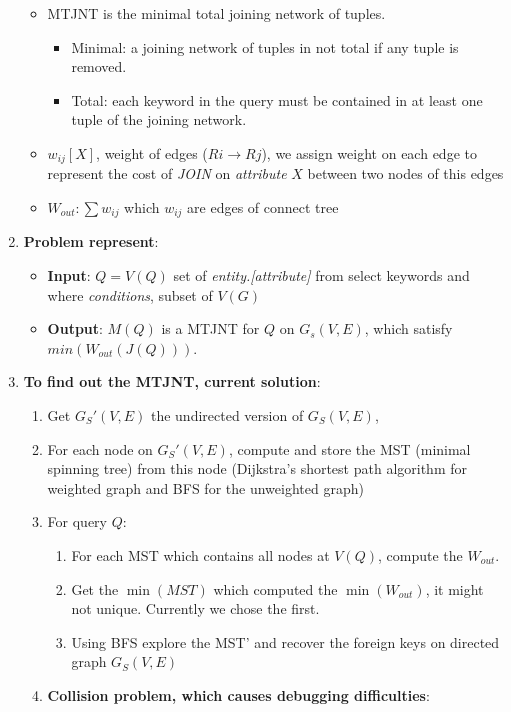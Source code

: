 \begin{enumerate}
\begin{itemize}
  \item MTJNT is the minimal total joining network of tuples.
    \begin{itemize}
    \item Minimal: a joining network of tuples in not total if any tuple is removed.
    \item Total: each keyword in the query must be contained in at least one tuple of the joining network.
    \end{itemize}
  \item $w_{ij}[X]$, weight of edges ($Ri \rightarrow Rj$), we assign weight on each edge to represent the cost of {\it JOIN} on {\it attribute} $X$ between two nodes of this edges
  \item $W_{out}: \sum{w_{ij}}$ which $w_{ij}$ are edges of connect tree 
  \end{itemize}
\item {\bf Problem represent}:
\begin{itemize}
  \item {\bf Input}: $Q = V(Q)$  set of {\it entity.[attribute]} from select keywords and where {\it conditions}, subset of $V(G)$ 
  \item {\bf Output}: $M(Q)$ is a MTJNT for $Q$ on $G_s(V,E)$, which satisfy \\
        $min(W_{out}(J(Q)))$.
\end{itemize}
\item {\bf To find out the MTJNT, current solution}:
  \begin{enumerate}
  \item Get $G_S'(V,E)$ the undirected version of $G_S(V, E)$,
  \item For each node on $G_S'(V,E)$, compute and store the MST (minimal spinning tree) from this node (Dijkstra's shortest path algorithm for weighted graph and BFS for the unweighted graph)
  \item For query $Q$:
    \begin{enumerate}
    \item For each MST which contains all nodes at $V(Q)$, compute the $W_{out}$.
    \item Get the $\min(MST)$ which computed the $\min(W_{out})$, it might not unique. Currently we chose the first.
    \item Using BFS explore the MST' and recover the foreign keys on directed graph $G_S(V,E)$
  \end{enumerate}
\item {\bf Collision problem, which causes debugging difficulties}:

\end{enumerate}
\end{enumerate}
